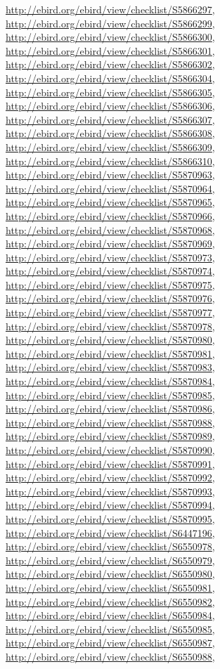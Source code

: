 \documentclass[9pt, article]{memoir}
\begin{document}
\begin{multicols}{2}
\url{http://ebird.org/ebird/view/checklist/S5866297}, 
\url{http://ebird.org/ebird/view/checklist/S5866299}, 
\url{http://ebird.org/ebird/view/checklist/S5866300}, 
\url{http://ebird.org/ebird/view/checklist/S5866301}, 
\url{http://ebird.org/ebird/view/checklist/S5866302}, 
\url{http://ebird.org/ebird/view/checklist/S5866304}, 
\url{http://ebird.org/ebird/view/checklist/S5866305}, 
\url{http://ebird.org/ebird/view/checklist/S5866306}, 
\url{http://ebird.org/ebird/view/checklist/S5866307}, 
\url{http://ebird.org/ebird/view/checklist/S5866308}, 
\url{http://ebird.org/ebird/view/checklist/S5866309}, 
\url{http://ebird.org/ebird/view/checklist/S5866310}, 
\url{http://ebird.org/ebird/view/checklist/S5870963}, 
\url{http://ebird.org/ebird/view/checklist/S5870964}, 
\url{http://ebird.org/ebird/view/checklist/S5870965}, 
\url{http://ebird.org/ebird/view/checklist/S5870966}, 
\url{http://ebird.org/ebird/view/checklist/S5870968}, 
\url{http://ebird.org/ebird/view/checklist/S5870969}, 
\url{http://ebird.org/ebird/view/checklist/S5870973}, 
\url{http://ebird.org/ebird/view/checklist/S5870974}, 
\url{http://ebird.org/ebird/view/checklist/S5870975}, 
\url{http://ebird.org/ebird/view/checklist/S5870976}, 
\url{http://ebird.org/ebird/view/checklist/S5870977}, 
\url{http://ebird.org/ebird/view/checklist/S5870978}, 
\url{http://ebird.org/ebird/view/checklist/S5870980}, 
\url{http://ebird.org/ebird/view/checklist/S5870981}, 
\url{http://ebird.org/ebird/view/checklist/S5870983}, 
\url{http://ebird.org/ebird/view/checklist/S5870984}, 
\url{http://ebird.org/ebird/view/checklist/S5870985}, 
\url{http://ebird.org/ebird/view/checklist/S5870986}, 
\url{http://ebird.org/ebird/view/checklist/S5870988}, 
\url{http://ebird.org/ebird/view/checklist/S5870989}, 
\url{http://ebird.org/ebird/view/checklist/S5870990}, 
\url{http://ebird.org/ebird/view/checklist/S5870991}, 
\url{http://ebird.org/ebird/view/checklist/S5870992}, 
\url{http://ebird.org/ebird/view/checklist/S5870993}, 
\url{http://ebird.org/ebird/view/checklist/S5870994}, 
\url{http://ebird.org/ebird/view/checklist/S5870995}, 
\url{http://ebird.org/ebird/view/checklist/S6447196}, 
\url{http://ebird.org/ebird/view/checklist/S6550978}, 
\url{http://ebird.org/ebird/view/checklist/S6550979}, 
\url{http://ebird.org/ebird/view/checklist/S6550980}, 
\url{http://ebird.org/ebird/view/checklist/S6550981}, 
\url{http://ebird.org/ebird/view/checklist/S6550982}, 
\url{http://ebird.org/ebird/view/checklist/S6550984}, 
\url{http://ebird.org/ebird/view/checklist/S6550985}, 
\url{http://ebird.org/ebird/view/checklist/S6550987}, 
\url{http://ebird.org/ebird/view/checklist/S6550988}, 

\end{multicols}
\end{document}
